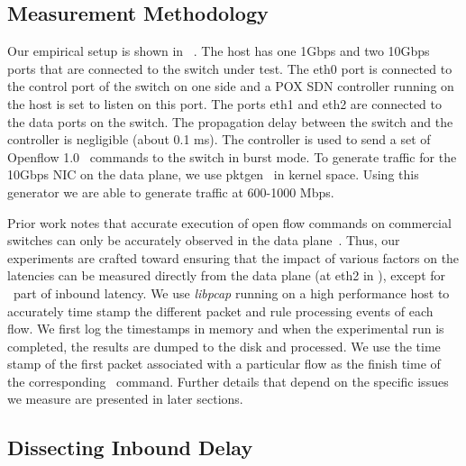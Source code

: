 
\subsection{Measurement Methodology}
Our empirical setup is shown in
~.
The host has one 1Gbps and two 10Gbps ports that are connected to the switch under test. 
The eth0 port is connected to the control port of the switch on one side and
a POX SDN controller running on the host is set to listen on this port. 
The ports eth1 and eth2 are connected to the data ports on the switch. 
The propagation delay between the switch and the controller is
negligible (about 0.1 ms). The controller is used to send a set of
Openflow 1.0 \flowmod\ commands to the switch in burst mode. To
generate traffic for the 10Gbps NIC on the data plane, we use
pktgen~\cite{pktgen} in kernel space. Using this generator we are
able to generate traffic at 600-1000 Mbps.

Prior work notes that accurate execution of open flow commands on
commercial switches can only be accurately observed in the data
plane~\cite{oflops}. Thus, our experiments are crafted toward ensuring
that the impact of various factors on the latencies can be measured
directly from the data plane (at eth2 in ), except for
\packetin\ part of inbound latency. We use
\emph{libpcap} running on a high performance host to accurately time
stamp the different packet and rule processing events of each flow. We
first log the timestamps in memory and when the experimental run is
completed, the results are dumped to the disk and processed. We use
the time stamp of the first packet associated with a particular flow
as the finish time of the corresponding \flowmod\ command. Further
details that depend on the specific issues we measure are presented in
later sections.



\subsection{Dissecting Inbound Delay}
\label{s:measure_inbound}

